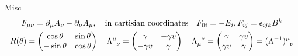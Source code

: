 \documentclass[main]{subfiles}
\begin{document}
Misc
\begin{gather}
    F_{\mu\nu} = \partial_\mu A_\nu - \partial_{\nu}A_\mu,\qq{in cartisian coordinates} F_{0i} = -E_i, F_{ij} = \epsilon_{ijk}B^{k}\\
    R(\theta) = \mqty(\cos\theta & \sin\theta \\ -\sin\theta & \cos\theta)\,\quad \Lambda\indices{^{\mu}_\nu} = \mqty(\gamma & -\gamma v \\ -\gamma v & \gamma)\,\quad
    \Lambda\indices{_{\mu}^\nu} = \mqty(\gamma & \gamma v \\ \gamma v & \gamma) = (\Lambda^{-1})\indices{^{\mu}_\nu}
\end{gather}
\end{document}
